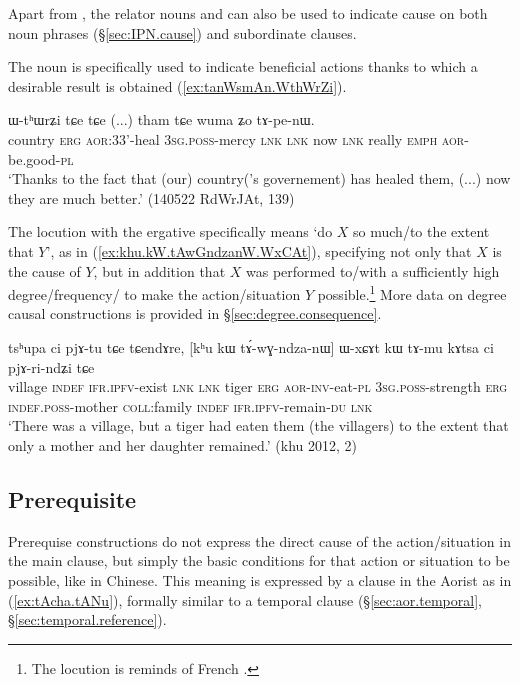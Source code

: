 Apart from , the relator nouns  and 
can also be used to indicate cause on both noun phrases (§\ref{sec:IPN.cause}) and subordinate clauses.

The noun  is specifically used to indicate beneficial actions thanks to which a desirable result is obtained (\ref{ex:tanWsmAn.WthWrZi}).

\begin{exe}
\ex \label{ex:tanWsmAn.WthWrZi}
 ɯ-tʰɯrʑi tɕe tɕe  (...) tham tɕe wuma ʑo tɤ-pe-nɯ. \\
country \textsc{erg} \textsc{aor}:3\fl{}3'-heal \textsc{3sg}.\textsc{poss}-mercy \textsc{lnk} \textsc{lnk} { } now \textsc{lnk} really \textsc{emph} \textsc{aor}-be.good-\textsc{pl} \\
\glt `Thanks to the fact that (our) country('s governement) has healed them, (...) now they are much better.' (140522 RdWrJAt, 139)
\end{exe}

The locution  with the ergative specifically means `do $X$ so much/to the extent that $Y$', as in (\ref{ex:khu.kW.tAwGndzanW.WxCAt}), specifying not only that $X$ is the cause of $Y$, but in addition that $X$ was performed to/with a sufficiently high degree/frequency/ to make the action/situation $Y$ possible.\footnote{The locution  is reminds of French . } More data on degree causal constructions is provided in §\ref{sec:degree.consequence}.

\begin{exe}
\ex \label{ex:khu.kW.tAwGndzanW.WxCAt}
\gll tsʰupa ci pjɤ-tu tɕe tɕendɤre, [kʰu kɯ tɤ́-wɣ-ndza-nɯ] ɯ-xɕɤt kɯ tɤ-mu kɤtsa ci pjɤ-ri-ndʑi tɕe \\
village \textsc{indef} \textsc{ifr}.\textsc{ipfv}-exist \textsc{lnk} \textsc{lnk} tiger \textsc{erg} \textsc{aor}-\textsc{inv}-eat-\textsc{pl} \textsc{3sg}.\textsc{poss}-strength \textsc{erg} \textsc{indef}.\textsc{poss}-mother \textsc{coll}:family \textsc{indef} \textsc{ifr}.\textsc{ipfv}-remain-\textsc{du} \textsc{lnk} \\
\glt `There was a village, but a tiger had eaten them (the villagers) to the extent that only a mother and her daughter remained.' (khu 2012, 2)
\end{exe}
 
\subsection{Prerequisite} \label{sec:prerequisite.clause}
Prerequise constructions do not express the direct cause of the action/situation in the main clause, but simply the basic conditions for that action or situation to be possible, like  in Chinese. This meaning is expressed by a clause in the Aorist as in (\ref{ex:tAcha.tANu}), formally similar to a temporal clause (§\ref{sec:aor.temporal}, §\ref{sec:temporal.reference}).

